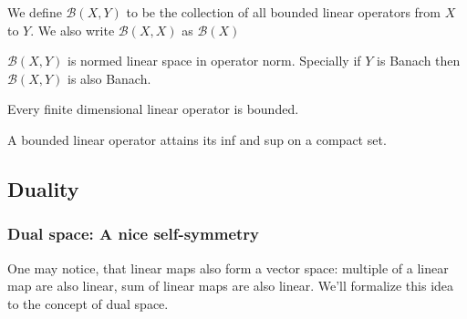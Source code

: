 \begin{definition}[$\mathscr B$]\rm\nextline
	We define $\mathscr B(X,Y)$ to be the collection of all bounded linear operators from $X$ to $Y$. We also write $\mathscr B(X,X)$ as $\mathscr B(X)$
\end{definition}

\begin{proposition}\rm\nextline
	$\mathscr B(X,Y)$ is normed linear space in operator norm. Specially if $Y$ is Banach then $\mathscr B(X,Y)$ is also Banach.
\end{proposition}

\begin{theorem}\rm\nextline
	Every finite dimensional linear operator is bounded.
\end{theorem}

\begin{theorem}\rm\nextline
	A bounded linear operator attains its inf and sup on  a compact set.
\end{theorem}




\subsection{Duality}

\subsubsection{Dual space: A nice self-symmetry}
One may notice, that linear maps also form a vector space: multiple of a linear map are also linear, sum of linear maps are also linear. We'll formalize this idea to the concept of dual space.

